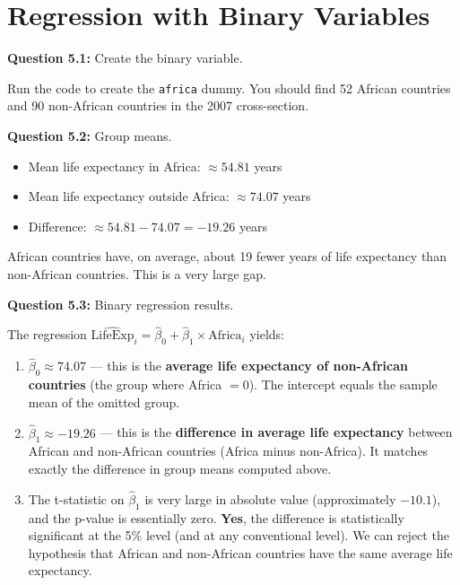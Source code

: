 \documentclass[11pt,letterpaper]{article}
\begin{document}
\section{Regression with Binary Variables}

\textbf{Question 5.1:} Create the binary variable.

\begin{answer}
Run the code to create the \texttt{africa} dummy. You should find 52 African countries and 90 non-African countries in the 2007 cross-section.
\end{answer}

\textbf{Question 5.2:} Group means.

\begin{answer}
\begin{itemize}[noitemsep]
\item Mean life expectancy in Africa: $\approx 54.81$ years
\item Mean life expectancy outside Africa: $\approx 74.07$ years
\item Difference: $\approx 54.81 - 74.07 = -19.26$ years
\end{itemize}

African countries have, on average, about 19 fewer years of life expectancy than non-African countries. This is a very large gap.
\end{answer}

\textbf{Question 5.3:} Binary regression results.

\begin{answer}
The regression $\widehat{\text{LifeExp}}_i = \hat{\beta}_0 + \hat{\beta}_1 \times \text{Africa}_i$ yields:

\begin{enumerate}[label=(\alph*)]
\item $\hat{\beta}_0 \approx 74.07$ --- this is the \textbf{average life expectancy of non-African countries} (the group where Africa $= 0$). The intercept equals the sample mean of the omitted group.

\item $\hat{\beta}_1 \approx -19.26$ --- this is the \textbf{difference in average life expectancy} between African and non-African countries (Africa minus non-Africa). It matches exactly the difference in group means computed above.

\item The t-statistic on $\hat{\beta}_1$ is very large in absolute value (approximately $-10.1$), and the p-value is essentially zero. \textbf{Yes}, the difference is statistically significant at the 5\% level (and at any conventional level). We can reject the hypothesis that African and non-African countries have the same average life expectancy.
\end{enumerate}
\end{answer}
\end{document}
